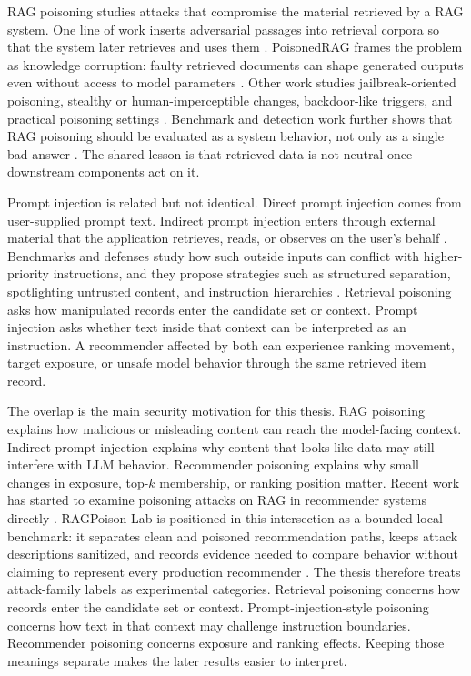 RAG poisoning studies attacks that compromise the material retrieved by a RAG system. One line of work inserts adversarial passages into retrieval corpora so that the system later retrieves and uses them \cite{zhong2023retrievalcorpora}. PoisonedRAG frames the problem as knowledge corruption: faulty retrieved documents can shape generated outputs even without access to model parameters \cite{zou2025poisonedrag_usenix}. Other work studies jailbreak-oriented poisoning, stealthy or human-imperceptible changes, backdoor-like triggers, and practical poisoning settings \cite{deng2024pandora,zhang2024humanimperceptible,xue2024badrag,zhang2026corruptrag}. Benchmark and detection work further shows that RAG poisoning should be evaluated as a system behavior, not only as a single bad answer \cite{zhang2025ragpoisonbench,tan2025revprag}. The shared lesson is that retrieved data is not neutral once downstream components act on it.

Prompt injection is related but not identical. Direct prompt injection comes from user-supplied prompt text. Indirect prompt injection enters through external material that the application retrieves, reads, or observes on the user's behalf \cite{greshake2023indirectpi}. Benchmarks and defenses study how such outside inputs can conflict with higher-priority instructions, and they propose strategies such as structured separation, spotlighting untrusted content, and instruction hierarchies \cite{yi2025bipia,debenedetti2024agentdojo,chen2024struq,hines2024spotlighting,wallace2024instructionhierarchy}. Retrieval poisoning asks how manipulated records enter the candidate set or context. Prompt injection asks whether text inside that context can be interpreted as an instruction. A recommender affected by both can experience ranking movement, target exposure, or unsafe model behavior through the same retrieved item record.

The overlap is the main security motivation for this thesis. RAG poisoning explains how malicious or misleading content can reach the model-facing context. Indirect prompt injection explains why content that looks like data may still interfere with LLM behavior. Recommender poisoning explains why small changes in exposure, top-$k$ membership, or ranking position matter. Recent work has started to examine poisoning attacks on RAG in recommender systems directly \cite{nazary2025poisonrag}. RAGPoison Lab is positioned in this intersection as a bounded local benchmark: it separates clean and poisoned recommendation paths, keeps attack descriptions sanitized, and records evidence needed to compare behavior without claiming to represent every production recommender \cite{ragpoisonlab_repo}. The thesis therefore treats attack-family labels as experimental categories. Retrieval poisoning concerns how records enter the candidate set or context. Prompt-injection-style poisoning concerns how text in that context may challenge instruction boundaries. Recommender poisoning concerns exposure and ranking effects. Keeping those meanings separate makes the later results easier to interpret.

